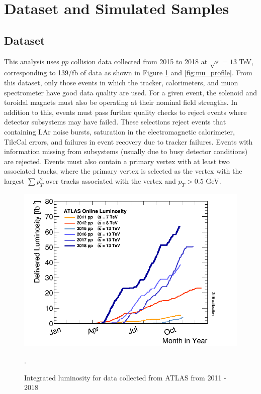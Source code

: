 \label{ch:analysis}
\section{Dataset and Simulated Samples}
\subsection{Dataset}
This analysis uses $pp$ collision data collected from 2015 to 2018 at $\sqrt{s}=13$ TeV, corresponding to 139/fb of data as shown in Figure \ref{fig:int_lumi} and \ref{fig:mu_profile}. From this dataset, only those events in which the tracker, calorimeters, and muon spectrometer have good data quality are used.  For a given event, the solenoid and toroidal magnets must also be operating at their nominal field strengths. In addition to this, events must pass further quality checks to reject events where detector subsystems may have failed. These selections reject events that containing LAr noise bursts, saturation in the electromagnetic calorimeter, TileCal errors, and failures in event recovery due to tracker failures. Events with information missing from subsystems (usually due to busy detector conditions) are rejected.  Events must also contain a primary vertex with at least two associated tracks, where the primary vertex is selected as the vertex with the largest $\sum p_{T}^{2}$ over tracks associated with the vertex and $p_{T}>0.5$ GeV.


\begin{figure}[h!]
  \centering
  \includegraphics[width=\hsize]{figures/Analysis/lumi.png}
  \caption{Integrated luminosity for data collected from ATLAS from 2011 - 2018}. 
  \label{fig:int_lumi}
\end{figure} 
\FloatBarrier


